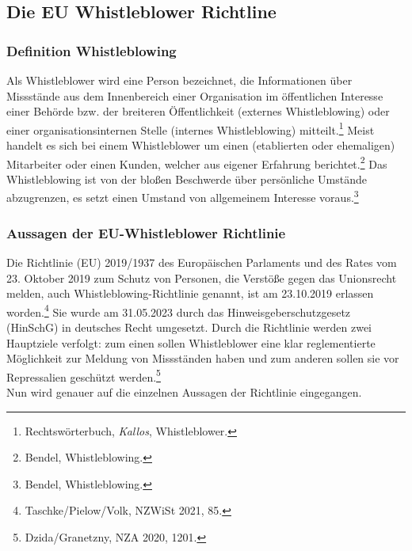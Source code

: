 \subsection{Die EU Whistleblower Richtline}
\label{sec:Teilkapitel}

\subsubsection{Definition Whistleblowing}
Als Whistleblower wird eine Person bezeichnet, die Informationen über Missstände aus dem Innenbereich einer Organisation im öffentlichen Interesse einer Behörde bzw. der breiteren Öffentlichkeit (externes Whistleblowing) oder einer organisationsinternen Stelle (internes Whistleblowing) mitteilt.\footnote{Rechtswörterbuch, \textit{Kallos}, Whistleblower.} 
Meist handelt es sich bei einem Whistleblower um einen (etablierten oder ehemaligen) Mitarbeiter oder einen Kunden, welcher aus eigener Erfahrung berichtet.\footnote{Bendel, Whistleblowing.}
Das Whistleblowing ist von der bloßen Beschwerde über persönliche Umstände abzugrenzen, es setzt einen Umstand von allgemeinem Interesse voraus.\footnote{Bendel, Whistleblowing.}


\subsubsection{Aussagen der EU-Whistleblower Richtlinie}

Die Richtlinie (EU) 2019/1937 des Europäischen Parlaments und des Rates vom 23. Oktober 2019 zum Schutz von Personen, die Verstöße gegen das Unionsrecht melden, auch Whistleblowing-Richtlinie genannt, ist am 23.10.2019 erlassen worden.\footnote{Taschke/Pielow/Volk, NZWiSt 2021, 85.}
Sie wurde am 31.05.2023 durch das Hinweisgeberschutzgesetz (HinSchG) in deutsches Recht umgesetzt.
Durch die Richtlinie werden zwei Hauptziele verfolgt: zum einen sollen Whistleblower eine klar reglementierte Möglichkeit zur Meldung von Missständen haben und zum anderen sollen sie vor Repressalien geschützt werden.\footnote{Dzida/Granetzny, NZA 2020, 1201.}\\
Nun wird genauer auf die einzelnen Aussagen der Richtlinie eingegangen.

